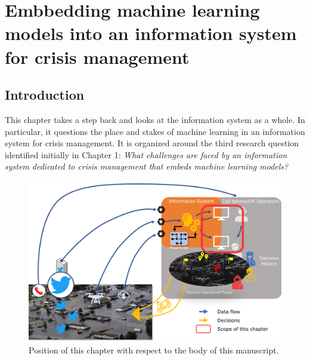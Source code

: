 \chapter{Embbedding machine learning models into an information system for crisis management}
\section*{Introduction}
This chapter takes a step back and looks at the information system as a whole.
In particular, it questions the place and stakes of machine learning in an information system for crisis management.
It is organized around the third research question identified initially in Chapter 1:
\emph{What challenges are faced by an information system dedicated to crisis management that embeds machine learning models?}

\begin{figure}[htb]
    \centering
    \includegraphics[width=\textwidth]{figures/chap-5/position-chapter.pdf}
    \caption{Position of this chapter with respect to the body of this manuscript.}
    \label{system:big-picture-manuscrit}
\end{figure}

